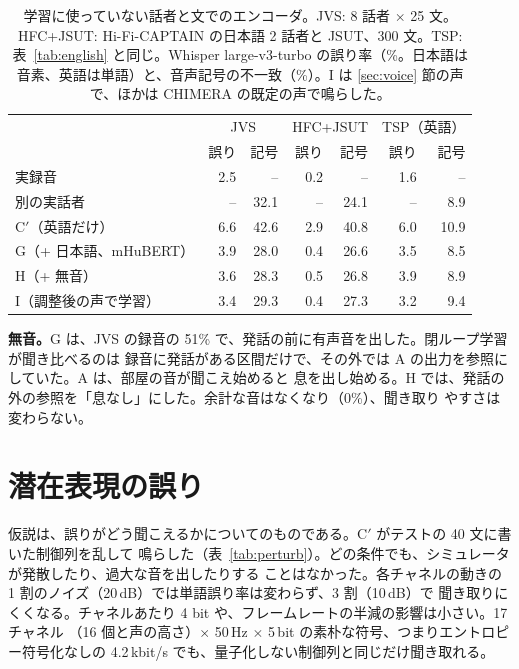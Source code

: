 \documentclass[10pt,a4paper,twocolumn]{article}
\begin{document}
\begin{table}[t]
\centering\footnotesize\setlength{\tabcolsep}{2.1pt}
\caption{学習に使っていない話者と文でのエンコーダ。JVS: 8 話者 $\times$ 25 文。HFC+JSUT:
Hi-Fi-CAPTAIN の日本語 2 話者と JSUT、300 文。TSP: 表~\ref{tab:english} と同じ。Whisper
large-v3-turbo の誤り率（\%。日本語は音素、英語は単語）と、音声記号の不一致（\%）。I は
\ref{sec:voice} 節の声で、ほかは CHIMERA の既定の声で鳴らした。}
\label{tab:japanese}
\begin{tabular}{@{}lrrrrrr@{}}
\toprule
& \multicolumn{2}{c}{JVS} & \multicolumn{2}{c}{HFC+JSUT} & \multicolumn{2}{c}{TSP（英語）}\\
& 誤り & 記号 & 誤り & 記号 & 誤り & 記号\\
\midrule
実録音 & 2.5 & -- & 0.2 & -- & 1.6 & --\\
別の実話者 & -- & 32.1 & -- & 24.1 & -- & 8.9\\
C$'$（英語だけ） & 6.6 & 42.6 & 2.9 & 40.8 & 6.0 & 10.9\\
G（+ 日本語、mHuBERT） & 3.9 & 28.0 & 0.4 & 26.6 & 3.5 & 8.5\\
H（+ 無音） & 3.6 & 28.3 & 0.5 & 26.8 & 3.9 & 8.9\\
I（調整後の声で学習） & 3.4 & 29.3 & 0.4 & 27.3 & 3.2 & 9.4\\
\bottomrule
\end{tabular}
\end{table}

\textbf{無音。}G は、JVS の録音の 51\% で、発話の前に有声音を出した。閉ループ学習が聞き比べるのは
録音に発話がある区間だけで、その外では A の出力を参照にしていた。A は、部屋の音が聞こえ始めると
息を出し始める。H では、発話の外の参照を「息なし」にした。余計な音はなくなり（0\%）、聞き取り
やすさは変わらない。

\section{潜在表現の誤り}\label{sec:perturb}
仮説は、誤りがどう聞こえるかについてのものである。C$'$ がテストの 40 文に書いた制御列を乱して
鳴らした（表~\ref{tab:perturb}）。どの条件でも、シミュレータが発散したり、過大な音を出したりする
ことはなかった。各チャネルの動きの 1 割のノイズ（20\,dB）では単語誤り率は変わらず、3 割（10\,dB）で
聞き取りにくくなる。チャネルあたり 4 bit や、フレームレートの半減の影響は小さい。17 チャネル
（16 個と声の高さ）$\times$ 50\,Hz $\times$ 5\,bit の素朴な符号、つまりエントロピー符号化なしの
4.2\,kbit/s でも、量子化しない制御列と同じだけ聞き取れる。
\end{document}
